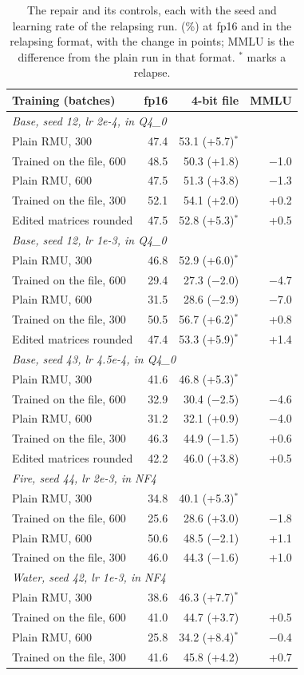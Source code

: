 \begin{table}[!t]
\centering\footnotesize\setlength{\tabcolsep}{3.5pt}
\begin{tabular}{lrrr}
\toprule
Training (batches) & fp16 & 4-bit file & MMLU \\
\midrule
\multicolumn{4}{l}{\emph{Base, seed 12, lr 2e-4, in Q4\_0}} \\
Plain RMU, 300 & 47.4 & 53.1 (+5.7)$^{*}$ & \\
Trained on the file, 600 & 48.5 & 50.3 (+1.8) & $-$1.0 \\
Plain RMU, 600 & 47.5 & 51.3 (+3.8) & $-$1.3 \\
Trained on the file, 300 & 52.1 & 54.1 (+2.0) & +0.2 \\
Edited matrices rounded & 47.5 & 52.8 (+5.3)$^{*}$ & +0.5 \\
\multicolumn{4}{l}{\emph{Base, seed 12, lr 1e-3, in Q4\_0}} \\
Plain RMU, 300 & 46.8 & 52.9 (+6.0)$^{*}$ & \\
Trained on the file, 600 & 29.4 & 27.3 ($-$2.0) & $-$4.7 \\
Plain RMU, 600 & 31.5 & 28.6 ($-$2.9) & $-$7.0 \\
Trained on the file, 300 & 50.5 & 56.7 (+6.2)$^{*}$ & +0.8 \\
Edited matrices rounded & 47.4 & 53.3 (+5.9)$^{*}$ & +1.4 \\
\multicolumn{4}{l}{\emph{Base, seed 43, lr 4.5e-4, in Q4\_0}} \\
Plain RMU, 300 & 41.6 & 46.8 (+5.3)$^{*}$ & \\
Trained on the file, 600 & 32.9 & 30.4 ($-$2.5) & $-$4.6 \\
Plain RMU, 600 & 31.2 & 32.1 (+0.9) & $-$4.0 \\
Trained on the file, 300 & 46.3 & 44.9 ($-$1.5) & +0.6 \\
Edited matrices rounded & 42.2 & 46.0 (+3.8) & +0.5 \\
\multicolumn{4}{l}{\emph{Fire, seed 44, lr 2e-3, in NF4}} \\
Plain RMU, 300 & 34.8 & 40.1 (+5.3)$^{*}$ & \\
Trained on the file, 600 & 25.6 & 28.6 (+3.0) & $-$1.8 \\
Plain RMU, 600 & 50.6 & 48.5 ($-$2.1) & +1.1 \\
Trained on the file, 300 & 46.0 & 44.3 ($-$1.6) & +1.0 \\
\multicolumn{4}{l}{\emph{Water, seed 42, lr 1e-3, in NF4}} \\
Plain RMU, 300 & 38.6 & 46.3 (+7.7)$^{*}$ & \\
Trained on the file, 600 & 41.0 & 44.7 (+3.7) & +0.5 \\
Plain RMU, 600 & 25.8 & 34.2 (+8.4)$^{*}$ & $-$0.4 \\
Trained on the file, 300 & 41.6 & 45.8 (+4.2) & +0.7 \\
\bottomrule
\end{tabular}
\caption{The repair and its controls, each with the seed and learning rate of the relapsing run. \wmdp{} (\%) at fp16 and in the relapsing format, with the change in points; MMLU is the difference from the plain run in that format. $^{*}$ marks a relapse.}
\label{tab:repair}
\end{table}

